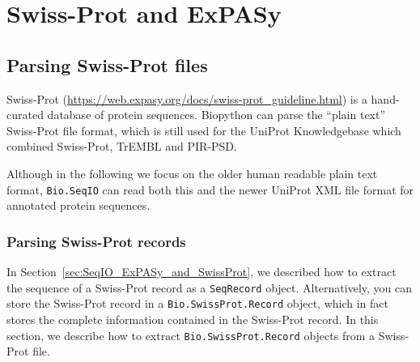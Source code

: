 \chapter{Swiss-Prot and ExPASy}
\label{chapter:uniprot}

\section{Parsing Swiss-Prot files}

Swiss-Prot (\url{https://web.expasy.org/docs/swiss-prot_guideline.html}) is a hand-curated database of protein sequences.  Biopython can parse the ``plain text'' Swiss-Prot file format, which is still used for the UniProt Knowledgebase which combined Swiss-Prot, TrEMBL and PIR-PSD.

Although in the following we focus on the older human readable plain text format, \verb|Bio.SeqIO| can read both this and the newer UniProt XML file format for annotated protein sequences.

\subsection{Parsing Swiss-Prot records}

In Section~\ref{sec:SeqIO_ExPASy_and_SwissProt}, we described how to extract the sequence of a Swiss-Prot record as a \verb|SeqRecord| object. Alternatively, you can store the Swiss-Prot record in a \verb|Bio.SwissProt.Record| object, which in fact stores the complete information contained in the Swiss-Prot record. In this section, we describe how to extract \verb|Bio.SwissProt.Record| objects from a Swiss-Prot file.


